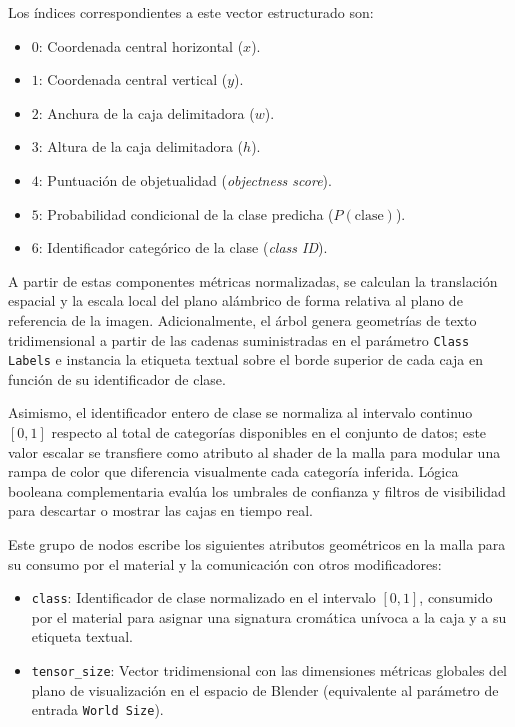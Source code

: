 Los índices correspondientes a este vector estructurado son:
\begin{itemize}
    \item $0$: Coordenada central horizontal ($x$).
    \item $1$: Coordenada central vertical ($y$).
    \item $2$: Anchura de la caja delimitadora ($w$).
    \item $3$: Altura de la caja delimitadora ($h$).
    \item $4$: Puntuación de objetualidad (\textit{objectness score}).
    \item $5$: Probabilidad condicional de la clase predicha ($P(\text{clase})$).
    \item $6$: Identificador categórico de la clase (\textit{class ID}).
\end{itemize}
A partir de estas componentes métricas normalizadas, se calculan la translación espacial y la escala local del plano alámbrico de forma relativa al 
plano de referencia de la imagen. Adicionalmente, el árbol genera geometrías de texto tridimensional a partir de las cadenas suministradas en 
el parámetro \texttt{Class Labels} e instancia la etiqueta textual sobre el borde superior de cada caja en función de su identificador de clase.
\medskip 

Asimismo, el identificador entero de clase se normaliza al intervalo continuo $[0, 1]$ respecto al total de categorías disponibles en el conjunto 
de datos; este valor escalar se transfiere como atributo al shader de la malla para modular una rampa de color que diferencia visualmente cada categoría 
inferida. Lógica booleana complementaria evalúa los umbrales de confianza y filtros de visibilidad para descartar o mostrar las cajas en tiempo real.
\medskip

Este grupo de nodos escribe los siguientes atributos geométricos en la malla para su consumo por el material y la comunicación con otros modificadores:
\begin{itemize}
    \item \texttt{class}: Identificador de clase normalizado en el intervalo $[0, 1]$, consumido por el material para asignar una 
    signatura cromática unívoca a la caja y a su etiqueta textual.
    \item \texttt{tensor\_size}: Vector tridimensional con las dimensiones métricas globales del plano de visualización en el espacio de Blender 
    (equivalente al parámetro de entrada \texttt{World Size}).
\end{itemize}

